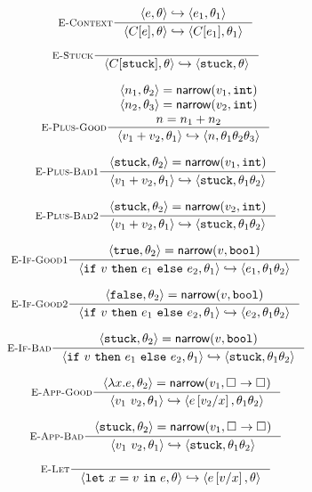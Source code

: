 \begin{figure}
$$
\inference[\recontext]
  {\step{e}{\su}{e_1}{\su_1}}
  {\step{C[e]}{\su}{C[e_1]}{\su_1}}
$$

$$
\inference[\restuck]
  {}
  {\step{C[\stuck]}{\su}{\stuck}{\su}}
$$

$$
\inference[\replusgood]
  {\pair{n_1}{\su_2} = \force{v_1}{\tint} \\
   \pair{n_2}{\su_3} = \force{v_2}{\tint} \\ 
   n = \eplus{n_1}{n_2}}
  {\step{\eplus{v_1}{v_2}}{\su_1}{n}{\su_1\su_2\su_3}}
$$

$$
\inference[\replusbadone]
  {\pair{\stuck}{\su_2} = \force{v_1}{\tint}}
  {\step{\eplus{v_1}{v_2}}{\su_1}{\stuck}{\su_1\su_2}}
$$

$$
\inference[\replusbadtwo]
  {\pair{\stuck}{\su_2} = \force{v_2}{\tint}}
  {\step{\eplus{v_1}{v_2}}{\su_1}{\stuck}{\su_1\su_2}}
$$

$$
\inference[\reifgoodone]
  {\pair{\etrue}{\su_2} = \force{v}{\tbool}}
  {\step{\eif{v}{e_1}{e_2}}{\su_1}{e_1}{\su_1\su_2}}
$$

$$
\inference[\reifgoodtwo]
  {\pair{\efalse}{\su_2} = \force{v}{\tbool}}
  {\step{\eif{v}{e_1}{e_2}}{\su_1}{e_2}{\su_1\su_2}}
$$

$$
\inference[\reifbad]
  {\pair{\stuck}{\su_2} = \force{v}{\tbool}}
  {\step{\eif{v}{e_1}{e_2}}{\su_1}{\stuck}{\su_1\su_2}}
$$

$$
\inference[\reappgood]
  {\pair{\efun{x}{e}}{\su_2} = \force{v_1}{\tfun{\thole{}}{\thole{}}}}
  {\step{\eapp{v_1}{v_2}}{\su_1}{e\sub{x}{v_2}}{\su_1\su_2}}
$$

$$
\inference[\reappbad]
  {\pair{\stuck}{\su_2} = \force{v_1}{\tfun{\thole{}}{\thole{}}}}
  {\step{\eapp{v_1}{v_2}}{\su_1}{\stuck}{\su_1\su_2}}
$$

$$
\inference[\relet]
  {}
  {\step{\elet{x}{v}{e}}{\su}{e\sub{x}{v}}{\su}}
$$
\\ [0.1in]



\end{figure}
